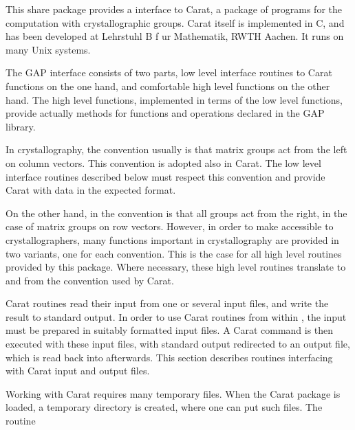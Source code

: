 
This share package provides a {\GAP} interface to Carat, 
a package of programs for the computation with crystallographic 
groups. Carat itself is implemented in C, and has been developed at 
Lehrstuhl B f{ u}r Mathematik, RWTH Aachen. It runs on many 
Unix systems.

The {GAP} interface consists of two parts, low level interface 
routines to Carat functions on the one hand, and comfortable high 
level {\GAP} functions on the other hand. The high level functions,
implemented in terms of the low level functions, provide actually
methods for functions and operations declared in the {GAP} library.



In crystallography, the convention usually is that matrix groups
act from the left on column vectors. This convention is adopted
also in Carat. The low level interface routines described below
must respect this convention and provide Carat with data in the 
expected format.

On the other hand, in {\GAP} the convention is that all groups 
act from the right, in the case of matrix groups on row vectors. 
However, in order to make {\GAP} accessible to crystallographers,
many functions important in crystallography are provided in two
variants, one for each convention. This is the case for all high
level routines provided by this package. Where necessary, these high
level routines translate to and from the convention used by Carat.


Carat routines read their input from one or several input files,
and write the result to standard output. In order to use Carat
routines from within {\GAP}, the input must be prepared in suitably
formatted input files. A Carat command is then executed with these
input files, with standard output redirected to an output file, 
which is read back into {\GAP} afterwards. This section describes
routines interfacing with Carat input and output files.

Working with Carat requires many temporary files. When the Carat
package is loaded, a temporary directory is created, where one can
put such files. The routine

